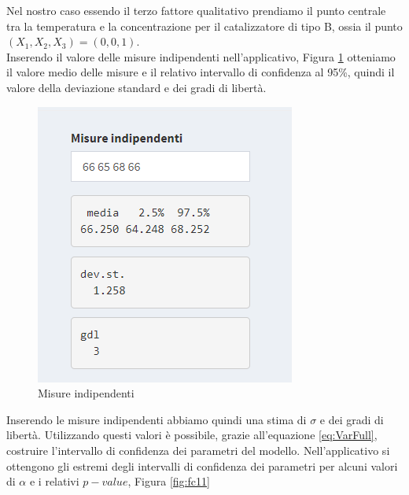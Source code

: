 \documentclass[
  11pt,
]{book}
\begin{document}
Nel nostro caso essendo il terzo fattore qualitativo prendiamo il punto
centrale tra la temperatura e la concentrazione per il catalizzatore di
tipo B, ossia il punto \((X_1,X_2,X_3)=(0,0,1)\).\\
Inserendo il valore delle misure indipendenti nell'applicativo,
Figura \ref{fig:fc10} otteniamo il valore medio delle misure e il relativo
intervallo di confidenza al 95\%, quindi il valore della deviazione
standard e dei gradi di libertà.

\begin{figure}

{\centering \includegraphics[width=1\linewidth]{Immagini/Fatt_compl/10_mis_ind} 

}

\caption{Misure indipendenti}\label{fig:fc10}
\end{figure}

Inserendo le misure indipendenti abbiamo quindi una stima di \(\sigma\) e
dei gradi di libertà. Utilizzando questi valori è possibile, grazie
all'equazione \eqref{eq:VarFull}, costruire l'intervallo di confidenza dei
parametri del modello. Nell'applicativo si ottengono gli estremi degli
intervalli di confidenza dei parametri per alcuni valori di \(\alpha\) e i
relativi \(p-value\), Figura \ref{fig:fc11}
\end{document}

